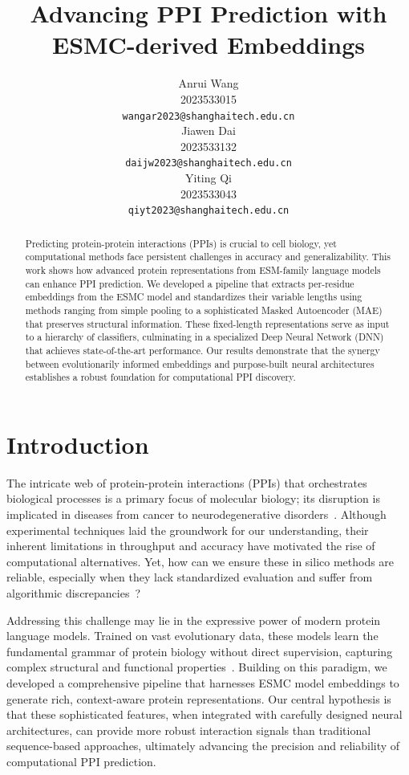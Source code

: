 \documentclass{article}
\title{Advancing PPI Prediction with ESMC-derived Embeddings}
\author{
	Anrui Wang \\
	2023533015 \\
	\texttt{wangar2023@shanghaitech.edu.cn}\\
	\And
	Jiawen Dai \\
	2023533132 \\
	\texttt{daijw2023@shanghaitech.edu.cn}\\
	 \AND
	 Yiting Qi \\
	 2023533043 \\
	 \texttt{qiyt2023@shanghaitech.edu.cn}\\
}
\begin{document}
	
	
	\maketitle
	
	
	\begin{abstract}
		Predicting protein-protein interactions (PPIs) is crucial to cell biology, yet computational methods face persistent challenges in accuracy and generalizability. This work shows how advanced protein representations from ESM-family language models can enhance PPI prediction. We developed a pipeline that extracts per-residue embeddings from the ESMC model and standardizes their variable lengths using methods ranging from simple pooling to a sophisticated Masked Autoencoder (MAE) that preserves structural information. These fixed-length representations serve as input to a hierarchy of classifiers, culminating in a specialized Deep Neural Network (DNN) that achieves state-of-the-art performance. Our results demonstrate that the synergy between evolutionarily informed embeddings and purpose-built neural architectures establishes a robust foundation for computational PPI discovery.
	\end{abstract}
	
	
\section{Introduction}

The intricate web of protein-protein interactions (PPIs) that orchestrates biological processes is a primary focus of molecular biology; its disruption is implicated in diseases from cancer to neurodegenerative disorders~\citep{recent_advances_ppi_2023}. Although experimental techniques laid the groundwork for our understanding, their inherent limitations in throughput and accuracy have motivated the rise of computational alternatives. Yet, how can we ensure these in silico methods are reliable, especially when they lack standardized evaluation and suffer from algorithmic discrepancies~\citep{evolution_language_model_2023}?

Addressing this challenge may lie in the expressive power of modern protein language models. Trained on vast evolutionary data, these models learn the fundamental grammar of protein biology without direct supervision, capturing complex structural and functional properties~\citep{pitfalls_ml_ppi_2023}. Building on this paradigm, we developed a comprehensive pipeline that harnesses ESMC model embeddings to generate rich, context-aware protein representations. Our central hypothesis is that these sophisticated features, when integrated with carefully designed neural architectures, can provide more robust interaction signals than traditional sequence-based approaches, ultimately advancing the precision and reliability of computational PPI prediction.
\end{document}
